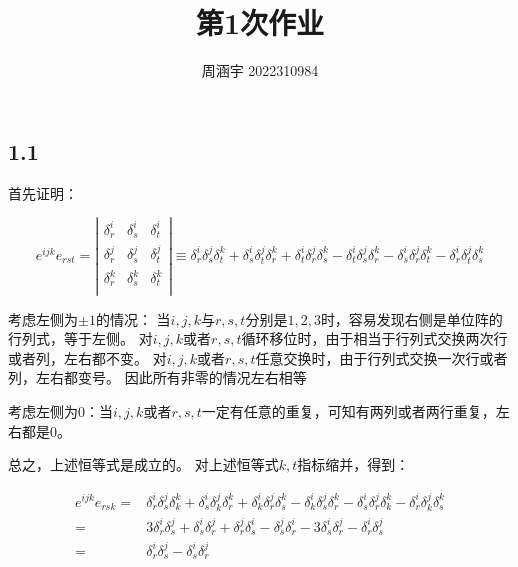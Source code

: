 \documentclass[UTF8,zihao=5]{ctexart}
\title{{\bfseries 第1次作业}}
\author{周涵宇 2022310984}
\date{}
\begin{document}
\maketitle

\subsection*{1.1}


首先证明：

\begin{equation*}
    e^{ijk}e_{rst}=
    \left|
    \begin{matrix}
        \delta^i_r & \delta^i_s & \delta^i_t \\
        \delta^j_r & \delta^j_s & \delta^j_t \\
        \delta^k_r & \delta^k_s & \delta^k_t \\
    \end{matrix}
    \right|
    \equiv 
    \delta^i_r\delta^j_s\delta^k_t +
    \delta^i_s\delta^j_t\delta^k_r +
    \delta^i_t\delta^j_r\delta^k_s -
    \delta^i_t\delta^j_s\delta^k_r -
    \delta^i_s\delta^j_r\delta^k_t -
    \delta^i_r\delta^j_t\delta^k_s
\end{equation*}

考虑左侧为$\pm 1$的情况：
当$i,j,k$与$r,s,t$分别是$1,2,3$时，容易发现右侧是单位阵的行列式，等于左侧。
对$i,j,k$或者$r,s,t$循环移位时，由于相当于行列式交换两次行或者列，左右都不变。
对$i,j,k$或者$r,s,t$任意交换时，由于行列式交换一次行或者列，左右都变号。
因此所有非零的情况左右相等

考虑左侧为$0$：当$i,j,k$或者$r,s,t$一定有任意的重复，可知有两列或者两行重复，左右都是0。

总之，上述恒等式是成立的。
对上述恒等式$k,t$指标缩并，得到：

\begin{equation*}
    \begin{aligned}
        e^{ijk}e_{rsk}=&
    \delta^i_r\delta^j_s\delta^k_k +
    \delta^i_s\delta^j_k\delta^k_r +
    \delta^i_k\delta^j_r\delta^k_s -
    \delta^i_k\delta^j_s\delta^k_r -
    \delta^i_s\delta^j_r\delta^k_k -
    \delta^i_r\delta^j_k\delta^k_s\\
    =&
    3\delta^i_r\delta^j_s +
    \delta^i_s\delta^j_r +
    \delta^j_r\delta^i_s -
    \delta^j_s\delta^i_r -
    3\delta^i_s\delta^j_r -
    \delta^i_r\delta^j_s 
    \\
    =&\delta^i_r\delta^j_s -
    \delta^i_s\delta^j_r 
    \end{aligned}
\end{equation*}
\end{document}
